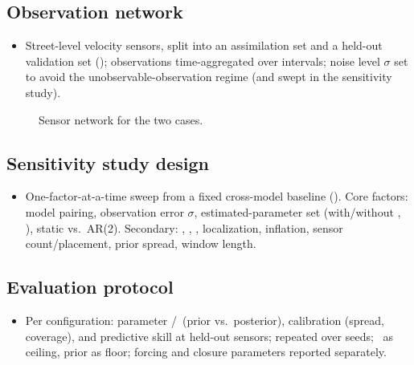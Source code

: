 \subsection{Observation network}
\label{sec:setup:obs}
\begin{itemize}
  \item Street-level velocity sensors, split into an assimilation set and a
        held-out validation set (); observations
        time-aggregated over intervals; noise level $\sigma$ set to avoid the
        unobservable-observation regime (and swept in the sensitivity study).
\end{itemize}

\begin{figure}[t]
  \centering
  \caption{Sensor network for the two cases.}
  \label{fig:sensors}
\end{figure}

\subsection{Sensitivity study design}
\label{sec:setup:study}
\begin{itemize}
  \item One-factor-at-a-time sweep from a fixed cross-model baseline
        (). Core factors: model pairing, observation error
        $\sigma$, estimated-parameter set (with/without \shearexp, \sgs),
        static vs.\ AR(2). Secondary: \Ne, \Na, \Nw, localization, inflation,
        sensor count/placement, prior spread, window length.
\end{itemize}

\begin{table}[t]
  \centering
  \caption{Sensitivity factors: swept values, baseline, hypothesis tested.}
  \label{tab:study}
\end{table}

\subsection{Evaluation protocol}
\label{sec:setup:eval}
\begin{itemize}
  \item Per configuration: parameter \RMSE/\CRPS\ (prior vs.\ posterior),
        calibration (spread, coverage), and predictive skill at held-out
        sensors; repeated over seeds; \twinexp\ as ceiling, prior as floor;
        forcing and closure parameters reported separately.
\end{itemize}
